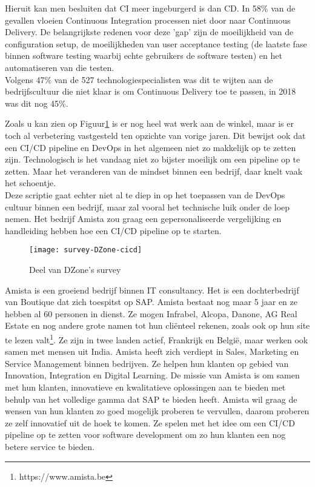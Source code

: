 Hieruit kan men besluiten dat CI meer ingeburgerd is dan CD. In 58\% van de gevallen vloeien Continuous Integration processen niet door naar Continuous Delivery. De belangrijkste redenen voor deze 'gap' zijn de moeilijkheid van de configuration setup, de moeilijkheden van user acceptance testing (de laatste fase binnen software testing waarbij echte gebruikers de software testen) en het automatiseren van die testen.\\
Volgens 47\% van de 527 technologiespecialisten was dit te wijten aan de bedrijfscultuur die niet klaar is om Continuous Delivery toe te passen, in 2018 was dit nog 45\%.

Zoals u kan zien op Figuur\ref{img-survey-cicd} is er nog heel wat werk aan de winkel, maar is er toch al verbetering vastgesteld ten opzichte van vorige jaren. Dit bewijst ook dat een CI/CD pipeline en DevOps in het algemeen niet zo makkelijk op te zetten zijn. Technologisch is het vandaag niet zo bijster moeilijk om een pipeline op te zetten. Maar het veranderen van de mindset binnen een bedrijf, daar knelt vaak het schoentje.\\
Deze scriptie gaat echter niet al te diep in op het toepassen van de DevOps cultuur binnen een bedrijf, maar zal vooral het technische luik onder de loep nemen. Het bedrijf Amista zou graag een gepersonaliseerde vergelijking en handleiding hebben hoe een CI/CD pipeline op te starten.

\begin{figure}	
    \texttt{[image: survey-DZone-cicd]}
    \caption{Deel van DZone's survey ~\autocite{Baker2019}} \label{img-survey-cicd}
\end{figure}

Amista is een groeiend bedrijf binnen IT consultancy. Het is een dochterbedrijf van Boutique dat zich toespitst op SAP. Amista bestaat nog maar 5 jaar en ze hebben al 60 personen in dienst. Ze mogen Infrabel, Alcopa, Danone, AG Real Estate en nog andere grote namen tot hun cliënteel rekenen, zoals ook op hun site te lezen valt\footnote{https://www.amista.be}. %
Ze zijn in twee landen actief, Frankrijk en België, maar werken ook samen met mensen uit India.
Amista heeft zich verdiept in Sales, Marketing en Service Management binnen bedrijven. Ze helpen hun klanten op gebied van Innovation, Integration en Digital Learning.
De missie van Amista is om samen met hun klanten, innovatieve en kwalitatieve oplossingen aan te bieden met behulp van het volledige gamma dat SAP te bieden heeft.
Amista wil graag de wensen van hun klanten zo goed mogelijk proberen te vervullen, daarom proberen ze zelf innovatief uit de hoek te komen. Ze spelen met het idee om een CI/CD pipeline op te zetten voor software development om zo hun klanten een nog betere service te bieden.

